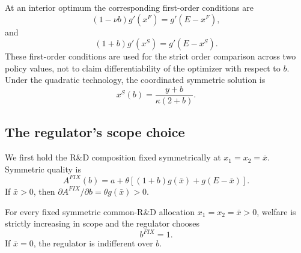 At an interior optimum the corresponding first-order conditions are
\begin{equation}
 (1-\nu b)g'(x^F)=g'(E-x^F),
 \label{eq:privategeneral}
\end{equation}
and
\begin{equation}
 (1+b)g'(x^S)=g'(E-x^S).
 \label{eq:socialgeneral}
\end{equation}
These first-order conditions are used for the strict order comparison across two policy values, not to claim differentiability of the optimizer with respect to $b$. Under the quadratic technology, the coordinated symmetric solution is
\begin{equation}
 x^S(b)=\frac{y+b}{\kappa(2+b)}.
 \label{eq:xsocial}
\end{equation}

\subsection{The regulator's scope choice}

We first hold the R\&D composition fixed symmetrically at $x_1=x_2=\bar x$. Symmetric quality is
\begin{equation}
 A^{FIX}(b)=a+\theta\left[(1+b)g(\bar x)+g(E-\bar x)\right].
\end{equation}
If $\bar x>0$, then $\partial A^{FIX}/\partial b=\theta g(\bar x)>0$.

\begin{proposition}\label{prop:benchmark}
For every fixed symmetric common-R\&D allocation $x_1=x_2=\bar x>0$, welfare is strictly increasing in scope and the regulator chooses
\begin{equation}
 b^{FIX}=1.
\end{equation}
If $\bar x=0$, the regulator is indifferent over $b$.
\end{proposition}

